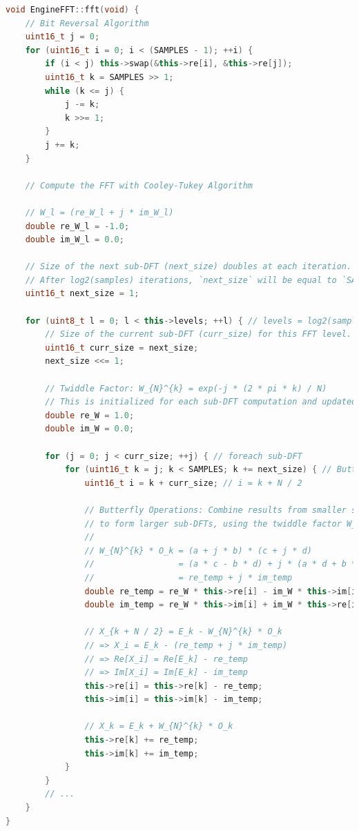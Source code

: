 \documentclass[a4paper,12pt]{report}  %
\begin{document}
\begin{lstlisting}[language=C++, keywords={void, uint16_t, while, for, if, double, this, uint8_t}]
void EngineFFT::fft(void) {
    // Bit Reversal Algorithm
    uint16_t j = 0;
    for (uint16_t i = 0; i < (SAMPLES - 1); ++i) {
        if (i < j) this->swap(&this->re[i], &this->re[j]);
        uint16_t k = SAMPLES >> 1;
        while (k <= j) {
            j -= k;
            k >>= 1;
        }
        j += k;
    }

    // Compute the FFT with Cooley-Tukey Algorithm

    // W_l = (re_W_l + j * im_W_l)
    double re_W_l = -1.0;
    double im_W_l = 0.0;

    // Size of the next sub-DFT (next_size) doubles at each iteration.
    // After log2(samples) iterations, `next_size` will be equal to `SAMPLES`.
    uint16_t next_size = 1;
    
    for (uint8_t l = 0; l < this->levels; ++l) { // levels = log2(samples)
        // Size of the current sub-DFT (curr_size) for this FFT level.
        uint16_t curr_size = next_size;
        next_size <<= 1;

        // Twiddle Factor: W_{N}^{k} = exp(-j * (2 * pi * k) / N)
        // This is initialized for each sub-DFT computation and updated iteratively.
        double re_W = 1.0;
        double im_W = 0.0;

        for (j = 0; j < curr_size; ++j) { // foreach sub-DFT
            for (uint16_t k = j; k < SAMPLES; k += next_size) { // Butterfly Operations
                uint16_t i = k + curr_size; // i = k + N / 2

                // Butterfly Operations: Combine results from smaller sub-DFTs
                // to form larger sub-DFTs, using the twiddle factor W_{N}^{k}.
                //
                // W_{N}^{k} * O_k = (a + j * b) * (c + j * d)
                //                 = (a * c - b * d) + j * (a * d + b * c)
                //                 = re_temp + j * im_temp
                double re_temp = re_W * this->re[i] - im_W * this->im[i];
                double im_temp = re_W * this->im[i] + im_W * this->re[i];
                
                // X_{k + N / 2} = E_k - W_{N}^{k} * O_k
                // => X_i = E_k - (re_temp + j * im_temp)
                // => Re[X_i] = Re[E_k] - re_temp
                // => Im[X_i] = Im[E_k] - im_temp
                this->re[i] = this->re[k] - re_temp;
                this->im[i] = this->im[k] - im_temp;
                
                // X_k = E_k + W_{N}^{k} * O_k
                this->re[k] += re_temp;
                this->im[k] += im_temp;
            }
        }
        // ...
    }
}
\end{lstlisting}
\end{document}
